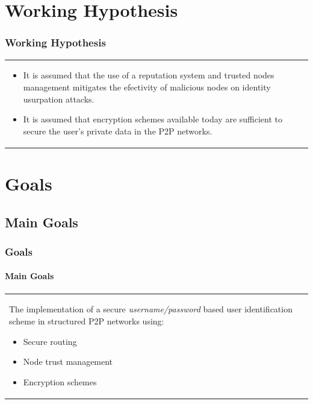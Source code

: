 \documentclass[12pt]{beamer}
\begin{document}
  \section{Working Hypothesis}
    \begin{frame}
    \frametitle{Working Hypothesis}
    \begin{table}
    \begin{tabular}{p{7cm}p{3cm}}
      \begin{itemize}
          \item It is assumed that the use of a reputation system and trusted nodes
            management mitigates the efectivity of malicious nodes on identity
            usurpation attacks.
          \item It is assumed that encryption schemes available today are
            sufficient to secure the user's private data in the P2P networks.
      \end{itemize}
    &
    \vspace{1.5cm}
    \end{tabular}
    \end{table}
    \end{frame}

  \section{Goals}
  \subsection{Main Goals}
    \begin{frame}
    \frametitle{Goals}
    \framesubtitle{Main Goals}
    \begin{table}
    \begin{tabular}{p{7cm}p{3cm}}
    The implementation of a secure \textit{username/password} based user identification scheme in structured P2P
    networks using:
    \begin{itemize}
      \item  Secure routing
      \item  Node trust management 
      \item  Encryption schemes
    \end{itemize}
    &
    \vspace{1.5cm}
    \end{tabular}
    \end{table}
    \end{frame}
\end{document}
